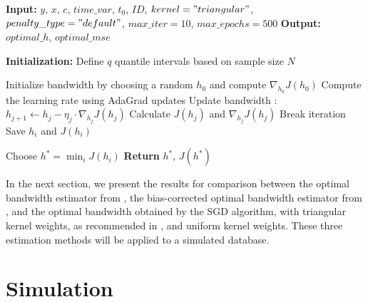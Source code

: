 \documentclass[12pt]{article}
\theoremstyle{plain}
\theoremstyle{remark}
\begin{document}
\begin{algorithm}[H]
\caption{Adaptive SGD Pseudo-code}
\begin{algorithmic}
\State \textbf{Input:} $y$, $x$, $c$, $time\_var$, $t_0$, $ID$, $kernel = "triangular"$, $penalty\_type = "default"$, $max\_iter=10$, $max\_epochs=500$
\State \textbf{Output:} $optimal\_h$, $optimal\_mse$

\State \textbf{Initialization:}
\State Define $q$ quantile intervals based on sample size $N$

        \State Initialize bandwidth by choosing a random $h_0$ and compute $\nabla_{h_0}J(h_0)$
            \State Compute the learning rate using AdaGrad updates
            \State Update bandwidth : $h_{j+1} \leftarrow h_j - \eta_j \cdot \nabla_{h_j} J(h_j) $
            \State Calculate $J(h_j)$ and $\nabla_{h_j} J(h_j)$
                \State Break iteration
            \EndIf
        \EndFor
        \State Save $h_i$ and $J(h_i)$
    \EndFor
\EndFor

\State Choose $h^*=\min_{i} J(h_i)$
\State \textbf{Return} $h^*$, $J(h^*)$
\end{algorithmic}
\end{algorithm}

In the next section, we present the results for comparison between the optimal bandwidth estimator from \textcite{Imbens2012}, the bias-corrected optimal bandwidth estimator from \textcite{Calonico2014Robust}, and the optimal bandwidth obtained by the SGD algorithm, with triangular kernel weights, as recommended in \textcite{Imbens2012}, and uniform kernel weights. These three estimation methods will be applied to a simulated database.

\newpage
\section{Simulation}
\label{sec:sim}
\end{document}
